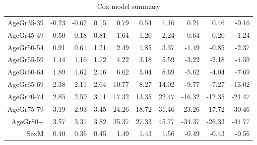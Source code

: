 \begin{table}[ht]
\begin{tabular}{rrrrrrrrrr}
  AgeGr35-39 & -0.23 & -0.62 & 0.15 & 0.79 & 0.54 & 1.16 & 0.21 & 0.46 & -0.16 \\ 
  AgeGr45-49 & 0.50 & 0.18 & 0.81 & 1.64 & 1.20 & 2.24 & -0.64 & -0.20 & -1.24 \\ 
  AgeGr50-54 & 0.91 & 0.61 & 1.21 & 2.49 & 1.85 & 3.37 & -1.49 & -0.85 & -2.37 \\ 
  AgeGr55-59 & 1.44 & 1.16 & 1.72 & 4.22 & 3.18 & 5.59 & -3.22 & -2.18 & -4.59 \\ 
  AgeGr60-64 & 1.89 & 1.62 & 2.16 & 6.62 & 5.04 & 8.69 & -5.62 & -4.04 & -7.69 \\ 
  AgeGr65-69 & 2.38 & 2.11 & 2.64 & 10.77 & 8.27 & 14.02 & -9.77 & -7.27 & -13.02 \\ 
  AgeGr70-74 & 2.85 & 2.59 & 3.11 & 17.32 & 13.35 & 22.47 & -16.32 & -12.35 & -21.47 \\ 
  AgeGr75-79 & 3.19 & 2.93 & 3.45 & 24.26 & 18.72 & 31.46 & -23.26 & -17.72 & -30.46 \\ 
  AgeGr80+ & 3.57 & 3.31 & 3.82 & 35.37 & 27.33 & 45.77 & -34.37 & -26.33 & -44.77 \\ 
  SexM & 0.40 & 0.36 & 0.45 & 1.49 & 1.43 & 1.56 & -0.49 & -0.43 & -0.56 \\ 
   \hline
\end{tabular}
\caption{Cox model summary} 
\end{table}

